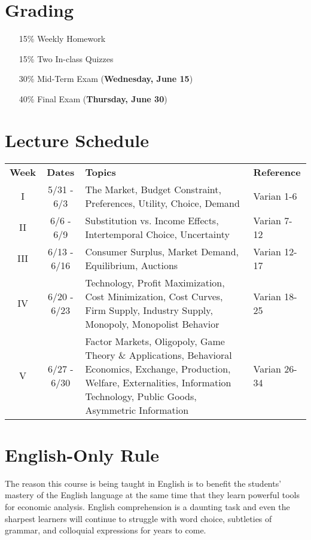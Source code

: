 \documentclass{article}
\begin{document}
\section*{Grading}

\begin{itemize}
\item [15\%] Weekly Homework
\item [15\%] Two In-class Quizzes
\item [30\%] Mid-Term Exam (\textbf{Wednesday, June 15})
\item [40\%] Final Exam (\textbf{Thursday, June 30})
\end{itemize}

\section*{Lecture Schedule}

\begin{table}[h]
\centering
\begin{tabular}{c c p{6cm} l}
\textbf{Week} & \textbf{Dates} & \textbf{Topics} & \textbf{Reference} \\
I & 5/31 - 6/3 & The Market, Budget Constraint, Preferences, Utility, Choice, Demand & Varian 1-6 \\
II & 6/6 - 6/9 & Substitution vs. Income Effects, Intertemporal Choice, Uncertainty & Varian 7-12 \\
III & 6/13 - 6/16 & Consumer Surplus, Market Demand, Equilibrium, Auctions & Varian 12-17 \\
IV & 6/20 - 6/23 & Technology, Profit Maximization, Cost Minimization, Cost Curves, Firm Supply, Industry Supply, Monopoly, Monopolist Behavior & Varian 18-25 \\ 
V & 6/27 - 6/30 & Factor Markets, Oligopoly, Game Theory \& Applications, Behavioral Economics, Exchange, Production, Welfare, Externalities, Information Technology, Public Goods, Asymmetric Information & Varian 26-34 \\
\end{tabular}
\end{table}

\section*{English-Only Rule}

The reason this course is being taught in English is to benefit the students' mastery of the English language at the same time that they learn powerful tools for economic analysis. English comprehension is a daunting task and even the sharpest learners will continue to struggle with word choice, subtleties of grammar, and colloquial expressions for years to come.
\end{document}
